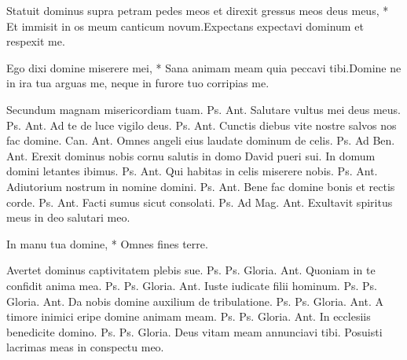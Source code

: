 \begin{multicols*}{2}
\begin{responsory}
{Statuit dominus supra petram pedes meos et direxit gressus meos deus meus, * Et immisit in os meum canticum novum.}{Expectans expectavi dominum et respexit me.}
\end{responsory}
\begin{responsory-doxology}
{Ego dixi domine miserere mei, * Sana animam meam quia peccavi tibi.}{Domine ne in ira tua arguas me, neque in furore tuo corripias me.}
\end{responsory-doxology}
 Secundum magnam misericordiam tuam. {\color{Red} Ps.}  {\color{Red} Ant.} Salutare vultus mei deus meus. {\color{Red} Ps.}  {\color{Red} Ant.} Ad te de luce vigilo deus. {\color{Red} Ps.}  {\color{Red} Ant.} Cunctis diebus vite nostre salvos nos fac domine. {\color{Red} Can.}  {\color{Red} Ant.} Omnes angeli eius laudate dominum de celis. {\color{Red} Ps.}  {\color{Red} Ad Ben. Ant.} Erexit dominus nobis cornu salutis in domo David pueri sui.
 In domum domini letantes ibimus. {\color{Red} Ps.}  {\color{Red} Ant.} Qui habitas in celis miserere nobis. {\color{Red} Ps.}  {\color{Red} Ant.} Adiutorium nostrum in nomine domini. {\color{Red} Ps.}  {\color{Red} Ant.} Bene fac domine bonis et rectis corde. {\color{Red} Ps.}  {\color{Red} Ant.} Facti sumus sicut consolati. {\color{Red} Ps.}  {\color{Red} Ad Mag. Ant.} Exultavit spiritus meus in deo salutari meo.
{\color{Red} }
\par {}
\begin{invitatory}
{In manu tua domine, * Omnes fines terre.}
\end{invitatory}
 Avertet dominus captivitatem plebis sue. {\color{Red} Ps.}  {\color{Red} Ps.}  Gloria. {\color{Red} Ant.} Quoniam in te confidit anima mea. {\color{Red} Ps.}  {\color{Red} Ps.}  Gloria. {\color{Red} Ant.} Iuste iudicate filii hominum. {\color{Red} Ps.}  {\color{Red} Ps.}  Gloria. {\color{Red} Ant.} Da nobis domine auxilium de tribulatione. {\color{Red} Ps.}  {\color{Red} Ps.}  Gloria. {\color{Red} Ant.} A timore inimici eripe domine animam meam. {\color{Red} Ps.} {\color{Red} Ps.}   Gloria. {\color{Red} Ant.} In ecclesiis benedicite domino. {\color{Red} Ps.}  {\color{Red} Ps.}  Gloria. \V Deus vitam meam annunciavi tibi. \R Posuisti lacrimas meas in conspectu meo. \R

\end{multicols*}
